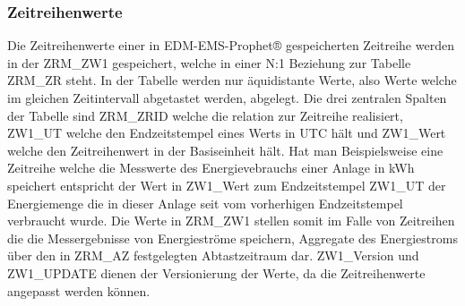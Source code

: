 \subsubsection{Zeitreihenwerte}

Die Zeitreihenwerte einer in EDM-EMS-Prophet® gespeicherten Zeitreihe werden in der ZRM\_ZW1 gespeichert, welche in einer N:1 Beziehung zur Tabelle ZRM\_ZR steht.
In der Tabelle werden nur äquidistante Werte, also Werte welche im gleichen Zeitintervall abgetastet werden, abgelegt.
Die drei zentralen Spalten der Tabelle sind ZRM\_ZRID welche die relation zur Zeitreihe realisiert, ZW1\_UT welche den Endzeitstempel eines Werts in UTC hält 
und ZW1\_Wert welche den Zeitreihenwert in der Basiseinheit hält.
Hat man Beispielsweise eine Zeitreihe welche die Messwerte des Energievebrauchs einer Anlage in kWh speichert entspricht der Wert in ZW1\_Wert zum Endzeitstempel 
ZW1\_UT der Energiemenge die in dieser Anlage seit vom vorherhigen Endzeitstempel verbraucht wurde. 
Die Werte in ZRM\_ZW1 stellen somit im Falle von Zeitreihen die die Messergebnisse von Energieströme speichern, Aggregate des Energiestroms über den in ZRM\_AZ 
festgelegten Abtastzeitraum dar.
ZW1\_Version und ZW1\_UPDATE dienen der Versionierung der Werte, da die Zeitreihenwerte angepasst werden können.